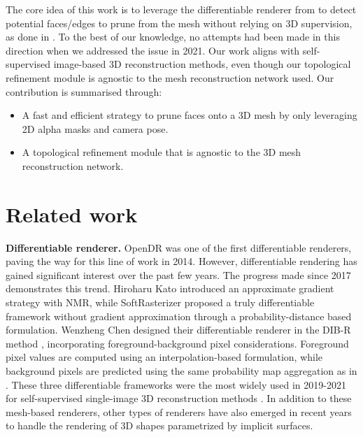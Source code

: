 The core idea of this work is to leverage the differentiable renderer from \citep{ravi2020accelarating} to detect potential faces/edges to prune from the mesh without relying on 3D supervision, as done in \citep{pan2019deep,nie2020total3dunderstanding,smith2019geometrics}. To the best of our knowledge, no attempts had been made in this direction when we addressed the issue in 2021. Our work aligns with self-supervised image-based 3D reconstruction methods, even though our topological refinement module is agnostic to the mesh reconstruction network used. Our contribution is summarised through: 
\begin{itemize}
    
    \item A fast and efficient strategy to prune faces onto a 3D mesh by only leveraging 2D alpha masks and camera pose. 

    \item A topological refinement module that is agnostic to the 3D mesh reconstruction network.
\end{itemize}

\section{Related work}
\label{sec:related_works}

\noindent\textbf{Differentiable renderer.} OpenDR \citep{loper2014opendr} was one of the first differentiable renderers, paving the way for this line of work in 2014. However, differentiable rendering has gained significant interest over the past few years. The progress made since 2017 demonstrates this trend. Hiroharu Kato \etal introduced an approximate gradient strategy with NMR\citep{kato2018neural}, while SoftRasterizer \citep{liu2019soft} proposed a truly differentiable framework without gradient approximation through a probability-distance based formulation. Wenzheng Chen \etal designed their differentiable renderer in the DIB-R method \citep{chen2019learning}, incorporating foreground-background pixel considerations. Foreground pixel values are computed using an interpolation-based formulation, while background pixels are predicted using the same probability map aggregation as in \citep{liu2019soft}. These three differentiable frameworks were the most widely used in 2019-2021 for self-supervised single-image 3D reconstruction methods \citep{kanazawa2018learning,li2020self,pavllo2020convolutional}. In addition to these mesh-based renderers, other types of renderers \citep{niemeyer2020differentiable,jiang2020sdfdiff} have also emerged in recent years to handle the rendering of 3D shapes parametrized by implicit surfaces. 

